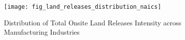 \begin{figure}[H]
    \centering
    \texttt{[image: fig\_land\_releases\_distribution\_naics]}
    \caption{Distribution of Total Onsite Land Releases Intensity across Manufacturing Industries}
    \label{fig:land-releases-distribution-naics}
\end{figure}